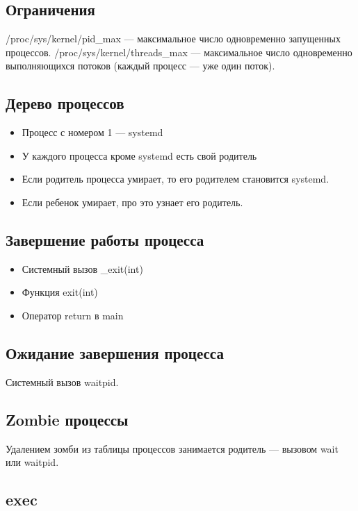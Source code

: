 \subsection{Ограничения}

/proc/sys/kernel/pid\_max --- максимальное число одновременно запущенных процессов.
/proc/sys/kernel/threads\_max --- максимальное число одновременно 
выполняющихся потоков (каждый процесс --- уже один поток).

\subsection{Дерево процессов}

\begin{itemize}
	\item Процесс с номером 1 --- systemd
	\item У каждого процесса кроме systemd есть свой родитель
	\item Если родитель процесса умирает, то его родителем становится systemd.
	\item Если ребенок умирает, про это узнает его родитель. 
\end{itemize}

\subsection{Завершение работы процесса}

\begin{itemize}
	\item Системный вызов \_exit(int)
	\item Функция exit(int)
	\item Оператор return в main
\end{itemize}

\subsection{Ожидание завершения процесса}

Системный вызов waitpid.

\subsection{Zombie процессы}

Удалением зомби из таблицы процессов занимается родитель --- 
вызовом wait или waitpid.

\subsection{exec}

